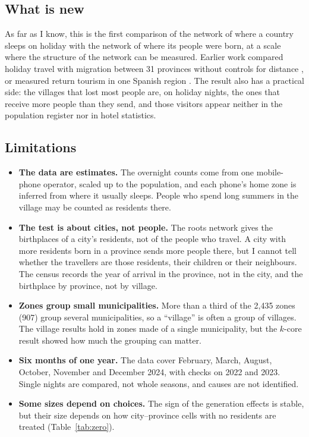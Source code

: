 \subsection{What is new}

As far as I know, this is the first comparison of the network of where a country sleeps on holiday with the network of where its people were born, at a scale where the structure of the network can be measured. Earlier work compared holiday travel with migration between 31 provinces without controls for distance \citep{li2016spring}, or measured return tourism in one Spanish region \citep{garciagonzalez2024retorno}. The result also has a practical side: the villages that lost most people are, on holiday nights, the ones that receive more people than they send, and those visitors appear neither in the population register nor in hotel statistics.

\subsection{Limitations}

\begin{itemize}
\item \textbf{The data are estimates.} The overnight counts come from one mobile-phone operator, scaled up to the population, and each phone's home zone is inferred from where it usually sleeps. People who spend long summers in the village may be counted as residents there.
\item \textbf{The test is about cities, not people.} The roots network gives the birthplaces of a city's residents, not of the people who travel. A city with more residents born in a province sends more people there, but I cannot tell whether the travellers are those residents, their children or their neighbours. The census records the year of arrival in the province, not in the city, and the birthplace by province, not by village.
\item \textbf{Zones group small municipalities.} More than a third of the 2,435 zones (907) group several municipalities, so a ``village'' is often a group of villages. The village results hold in zones made of a single municipality, but the $k$-core result showed how much the grouping can matter.
\item \textbf{Six months of one year.} The data cover February, March, August, October, November and December 2024, with checks on 2022 and 2023. Single nights are compared, not whole seasons, and causes are not identified.
\item \textbf{Some sizes depend on choices.} The sign of the generation effects is stable, but their size depends on how city--province cells with no residents are treated (Table~\ref{tab:zero}).
\end{itemize}

